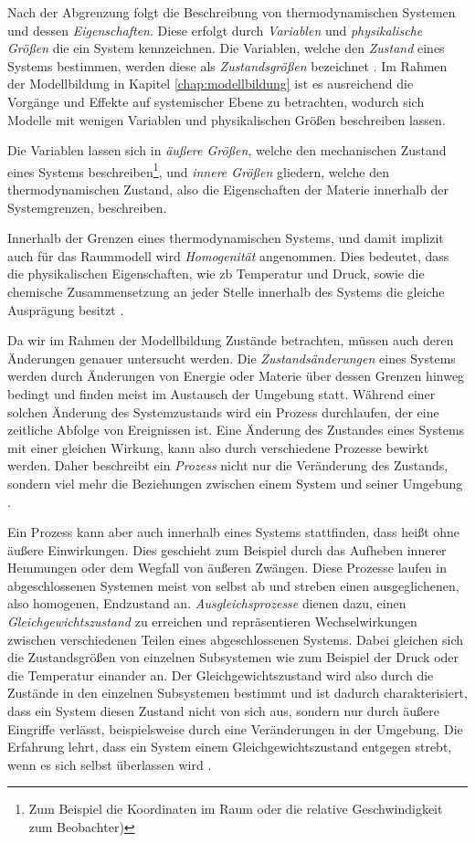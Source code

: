 Nach der Abgrenzung folgt die Beschreibung von thermodynamischen Systemen und dessen \textit{Eigenschaften}. Diese erfolgt durch \textit{Variablen} und \textit{physikalische Größen} die ein System kennzeichnen. Die Variablen, welche den \textit{Zustand} eines Systems bestimmen, werden diese als \textit{Zustandsgrößen} bezeichnet \cite[S.~13]{ba12}. Im Rahmen der Modellbildung in Kapitel \ref{chap:modellbildung} ist es ausreichend die Vorgänge und Effekte auf systemischer Ebene zu betrachten, wodurch sich Modelle mit wenigen Variablen und physikalischen Größen beschreiben lassen.

Die Variablen lassen sich in \textit{äußere Größen}, welche den mechanischen Zustand eines Systems beschreiben\footnote{Zum Beispiel die Koordinaten im Raum oder die relative Geschwindigkeit zum Beobachter)}, und \textit{innere Größen} gliedern, welche den thermodynamischen Zustand, also die Eigenschaften der Materie innerhalb der Systemgrenzen, beschreiben\cite[S.13~f.]{ba12}.

Innerhalb der Grenzen eines thermodynamischen Systems, und damit implizit auch für das Raummodell wird \textit{Homogenität} angenommen. Dies bedeutet, dass die physikalischen Eigenschaften, wie \acrlong{zb} Temperatur und Druck, sowie die chemische Zusammensetzung an jeder Stelle innerhalb des Systems die gleiche Ausprägung besitzt \cite[S.15]{ba12}.

Da wir im Rahmen der Modellbildung Zustände betrachten, müssen auch deren Änderungen genauer untersucht werden. Die \textit{Zustandsänderungen} eines Systems werden durch Änderungen von Energie oder Materie über dessen Grenzen hinweg bedingt und finden meist im Austausch der Umgebung statt. Während einer solchen Änderung des Systemzustands wird ein Prozess durchlaufen, der eine zeitliche Abfolge von Ereignissen ist. Eine Änderung des Zustandes eines Systems mit einer gleichen Wirkung, kann also durch verschiedene Prozesse bewirkt werden. Daher beschreibt ein \textit{Prozess} nicht nur die Veränderung des Zustands, sondern viel mehr die Beziehungen zwischen einem System und seiner Umgebung \cite[S.21~f.]{ba12}.

Ein Prozess kann aber auch innerhalb eines Systems stattfinden, dass heißt ohne äußere Einwirkungen. Dies geschieht zum Beispiel durch das Aufheben innerer Hemmungen oder dem Wegfall von äußeren Zwängen. Diese Prozesse laufen in abgeschlossenen Systemen meist von selbst ab und streben einen ausgeglichenen, also homogenen, Endzustand an. \textit{Ausgleichsprozesse} dienen dazu, einen \textit{Gleichgewichtszustand} zu erreichen und repräsentieren Wechselwirkungen zwischen verschiedenen Teilen eines abgeschlossenen Systems. Dabei gleichen sich die Zustandsgrößen von einzelnen Subsystemen wie zum Beispiel der Druck oder die Temperatur einander an. Der Gleichgewichtszustand wird also durch die Zustände in den einzelnen Subsystemen bestimmt und ist dadurch charakterisiert, dass ein System diesen Zustand nicht von sich aus, sondern nur durch äußere Eingriffe verlässt, beispielsweise durch eine Veränderungen in der Umgebung. Die Erfahrung lehrt, dass ein System einem Gleichgewichtszustand entgegen strebt, wenn es sich selbst überlassen wird \cite[S.22~f.]{ba12}.

